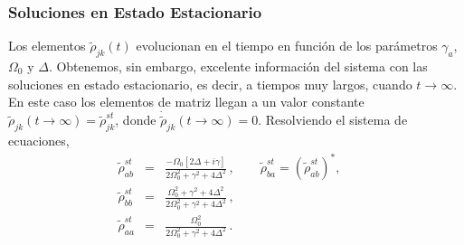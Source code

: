 \documentclass[twocolumn,aps,eqsecnum]{revtex4}
\begin{document}
\subsubsection{Soluciones en Estado Estacionario} 
Los elementos $\tilde{\rho}_{jk}(t)$ evolucionan en el tiempo en funci\'on de los 
par\'ametros $\gamma_a$, $\Omega_0$ y $\Delta$. Obtenemos, sin embargo, excelente informaci\'on del sistema con las soluciones en estado estacionario, 
es decir, a tiempos muy largos, cuando $t \to \infty$. En este caso los 
elementos de matriz llegan a un valor constante 
$\tilde{\rho}_{jk}(t \to \infty) = \tilde{\rho}_{jk}^{st}$, donde 
$\dot{\tilde{\rho}}_{jk} (t \to \infty) =0$. Resolviendo el sistema de ecuaciones, 
%
\begin{subequations}
\begin{eqnarray}
\tilde{\rho}_{ab}^{st} &=& \frac{-\Omega_0 [2\Delta + i \gamma]}
	{2\Omega_0^2 +\gamma^2 +4\Delta^2} \,, 
	\qquad \tilde{\rho}_{ba}^{st} = \left( \tilde{\rho}_{ab}^{st} \right)^\ast , 
	\quad \\ 
\tilde{\rho}_{bb}^{st} &=& \frac{\Omega_0^2 +\gamma^2 +4\Delta^2}
	{2\Omega_0^2 +\gamma^2 +4\Delta^2}  \,, \\ 
\tilde{\rho}_{aa}^{st} &=& \frac{\Omega_0^2}{2\Omega_0^2 
	+\gamma^2 +4\Delta^2}	\,.
\end{eqnarray}
\end{subequations}
\end{document}
